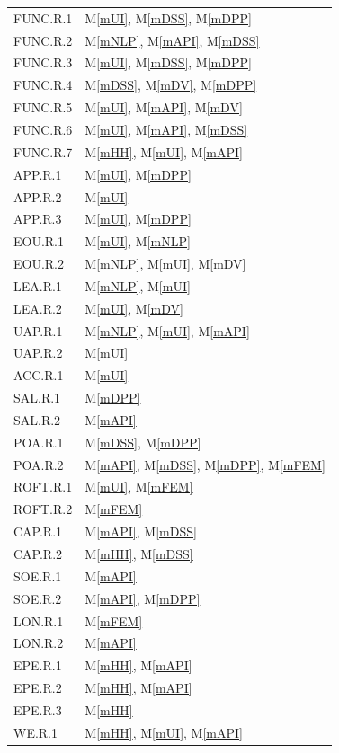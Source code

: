 \documentclass[12pt, titlepage]{article}
\newcommand{\mref}[1]{M\ref{#1}}
\begin{document}
\begin{longtable}{p{} p{}}
FUNC.R.1 & \mref{mUI}, \mref{mDSS},  \mref{mDPP}\\
FUNC.R.2 & \mref{mNLP}, \mref{mAPI}, \mref{mDSS} \\
FUNC.R.3 & \mref{mUI}, \mref{mDSS}, \mref{mDPP} \\
FUNC.R.4 & \mref{mDSS}, \mref{mDV}, \mref{mDPP} \\
FUNC.R.5 & \mref{mUI}, \mref{mAPI}, \mref{mDV} \\
FUNC.R.6 & \mref{mUI}, \mref{mAPI}, \mref{mDSS} \\
FUNC.R.7 & \mref{mHH}, \mref{mUI}, \mref{mAPI} \\
APP.R.1  & \mref{mUI}, \mref{mDPP} \\
APP.R.2  & \mref{mUI} \\
APP.R.3  & \mref{mUI}, \mref{mDPP} \\
EOU.R.1  & \mref{mUI}, \mref{mNLP} \\
EOU.R.2  & \mref{mNLP}, \mref{mUI}, \mref{mDV} \\
LEA.R.1  & \mref{mNLP}, \mref{mUI} \\
LEA.R.2  & \mref{mUI}, \mref{mDV} \\
UAP.R.1  & \mref{mNLP}, \mref{mUI}, \mref{mAPI} \\
UAP.R.2  & \mref{mUI} \\
ACC.R.1  & \mref{mUI} \\
SAL.R.1  & \mref{mDPP} \\
SAL.R.2  & \mref{mAPI} \\
POA.R.1  & \mref{mDSS}, \mref{mDPP} \\
POA.R.2  & \mref{mAPI}, \mref{mDSS}, \mref{mDPP}, \mref{mFEM} \\
ROFT.R.1 & \mref{mUI}, \mref{mFEM}\\
ROFT.R.2 & \mref{mFEM} \\
CAP.R.1  & \mref{mAPI}, \mref{mDSS} \\
CAP.R.2  & \mref{mHH}, \mref{mDSS} \\
SOE.R.1  & \mref{mAPI} \\
SOE.R.2  & \mref{mAPI}, \mref{mDPP} \\
LON.R.1  & \mref{mFEM} \\
LON.R.2  & \mref{mAPI} \\
EPE.R.1  & \mref{mHH}, \mref{mAPI} \\
EPE.R.2  & \mref{mHH}, \mref{mAPI} \\
EPE.R.3  & \mref{mHH} \\
WE.R.1   & \mref{mHH}, \mref{mUI}, \mref{mAPI} \\

\end{longtable}
\end{document}
